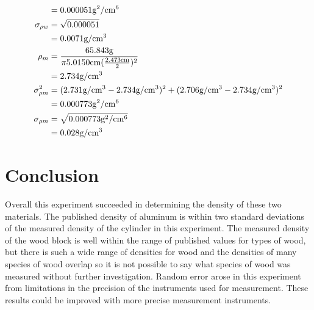 \documentclass[12pt]{article}
\begin{document}
\begin{align*}
        &= 0.000051\text{g}^2/\text{\text{cm}}^6\\
        \sigma_{\rho w} & = \sqrt{0.000051}\\
        &= 0.0071\text{g}/\text{\text{cm}}^3\\
        \rho_{m} &= \frac{65.843\text{g}}{\pi 5.0150\text{cm} (\frac{2.473\text{cm}}{2})^2}\\
        &= 2.734\text{g}/\text{\text{cm}}^3\\
        \sigma_{\rho m }^2 &= (2.731\text{g}/\text{\text{cm}}^3-2.734\text{g}/\text{\text{cm}}^3)^2 + (2.706\text{g}/\text{\text{cm}}^3-2.734\text{g}/\text{\text{cm}}^3)^2\\
        &= 0.000773\text{g}^2/\text{\text{cm}}^6\\
        \sigma_{\rho m } & = \sqrt{0.000773\text{g}^2/\text{\text{cm}}^6}\\
        &= 0.028\text{g}/\text{\text{cm}}^3
    \end{align*}

    \section{Conclusion}
        Overall this experiment succeeded in determining the density of these two materials. The 
        published density of aluminum is within two standard deviations of the measured density 
        of the cylinder in this experiment. The measured density of the wood block is well within 
        the range of published values for types of 
        wood, but there is such a wide range of densities for wood and the densities of many species 
        of wood overlap so it is not possible to say what species of wood was measured without 
        further investigation. Random error arose in this experiment from limitations in the precision 
        of the instruments used for measurement. These results could be improved with more precise 
        measurement instruments.
\end{document}

